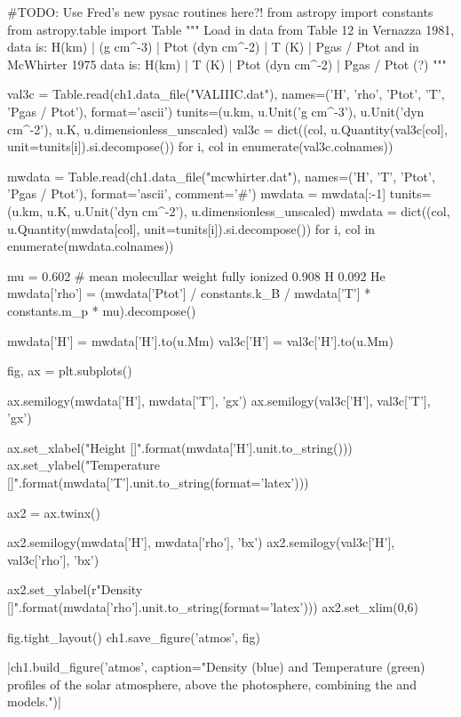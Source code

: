 \begin{pycode}[chapter1]
#TODO: Use Fred's new pysac routines here?!
from astropy import constants
from astropy.table import Table
"""
Load in data from Table 12 in Vernazza 1981,
data is:
    H(km) | \rho (g cm^-3) | Ptot (dyn cm^-2) | T (K) | Pgas / Ptot
and in McWhirter 1975 data is:
    H(km) | T (K)          | Ptot (dyn cm^-2) | Pgas / Ptot (?)
"""

val3c = Table.read(ch1.data_file("VALIIIC.dat"),
				  names=('H', 'rho', 'Ptot', 'T', 'Pgas / Ptot'),
				  format='ascii')
tunits=(u.km, u.Unit('g cm^-3'), u.Unit('dyn cm^-2'), u.K, u.dimensionless_unscaled)
val3c = dict((col, u.Quantity(val3c[col], unit=tunits[i]).si.decompose()) for i, col in enumerate(val3c.colnames))

mwdata = Table.read(ch1.data_file("mcwhirter.dat"),
				  names=('H', 'T', 'Ptot', 'Pgas / Ptot'),
				  format='ascii', comment='#')
mwdata = mwdata[:-1]
tunits=(u.km, u.K, u.Unit('dyn cm^-2'), u.dimensionless_unscaled)
mwdata = dict((col, u.Quantity(mwdata[col], unit=tunits[i]).si.decompose()) for i, col in enumerate(mwdata.colnames))

mu = 0.602  # mean molecullar weight fully ionized 0.908 H 0.092 He
mwdata['rho'] = (mwdata['Ptot'] / constants.k_B / mwdata['T'] * constants.m_p * mu).decompose()

mwdata['H'] = mwdata['H'].to(u.Mm)
val3c['H'] = val3c['H'].to(u.Mm)

fig, ax = plt.subplots()

ax.semilogy(mwdata['H'], mwdata['T'], 'gx')
ax.semilogy(val3c['H'], val3c['T'], 'gx')

ax.set_xlabel("Height [{}]".format(mwdata['H'].unit.to_string()))
ax.set_ylabel("Temperature [{}]".format(mwdata['T'].unit.to_string(format='latex')))

ax2 = ax.twinx()

ax2.semilogy(mwdata['H'], mwdata['rho'], 'bx')
ax2.semilogy(val3c['H'], val3c['rho'], 'bx')

ax2.set_ylabel(r"Density [{}]".format(mwdata['rho'].unit.to_string(format='latex')))
ax2.set_xlim(0,6)

fig.tight_layout()
ch1.save_figure('atmos', fig)
\end{pycode}

\py[chapter1]|ch1.build_figure('atmos',
caption="Density (blue) and Temperature (green) profiles of the solar atmosphere, above the photosphere, combining the \cite{mcwhirter1975} and \cite{vernazza1981} models.")|


